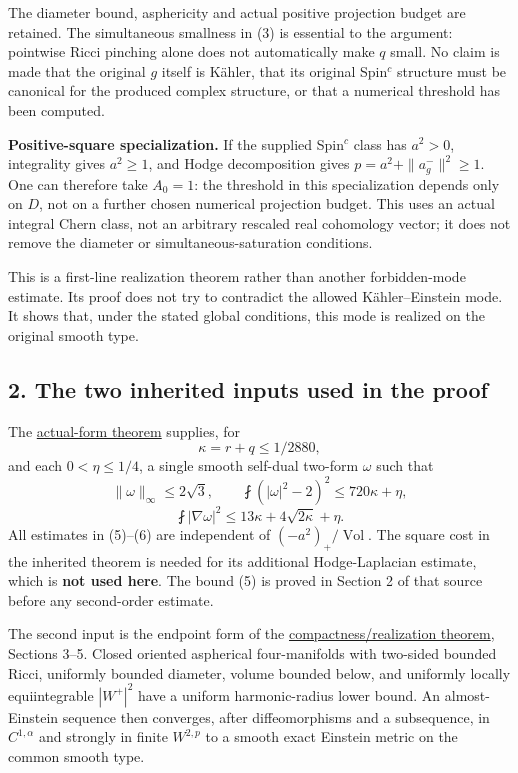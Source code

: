 \documentclass[
  11pt,
]{article}
\begin{document}
The diameter bound, asphericity and actual positive projection budget
are retained. The simultaneous smallness in (3) is essential to the
argument: pointwise Ricci pinching alone does not automatically make
\(q\) small. No claim is made that the original \(g\) itself is Kähler,
that its original Spin\(^c\) structure must be canonical for the
produced complex structure, or that a numerical threshold has been
computed.

\textbf{Positive-square specialization.} If the supplied Spin\(^c\)
class has \(a^2>0\), integrality gives \(a^2\ge1\), and Hodge
decomposition gives \(p=a^2+\|a_g^-\|^2\ge1\). One can therefore take
\(A_0=1\): the threshold in this specialization depends only on \(D\),
not on a further chosen numerical projection budget. This uses an actual
integral Chern class, not an arbitrary rescaled real cohomology vector;
it does not remove the diameter or simultaneous-saturation conditions.

This is a first-line realization theorem rather than another
forbidden-mode estimate. Its proof does not try to contradict the
allowed Kähler--Einstein mode. It shows that, under the stated global
conditions, this mode is realized on the original smooth type.

\hypertarget{the-two-inherited-inputs-used-in-the-proof}{%
\subsection{2. The two inherited inputs used in the
proof}\label{the-two-inherited-inputs-used-in-the-proof}}

The
\href{../mathematics/current/line1_composed_application.md}{actual-form
theorem} supplies, for \[
                  \kappa=r+q\le1/2880,
\] and each \(0<\eta\le1/4\), a single smooth self-dual two-form
\(\omega\) such that \[
 \|\omega\|_\infty\le2\sqrt3,
 \qquad \fint(|\omega|^2-2)^2\le720\kappa+\eta,
 \tag{5}
\] \[
 \fint|\nabla\omega|^2
        \le13\kappa+4\sqrt{2\kappa}+\eta.
 \tag{6}
\] All estimates in (5)--(6) are independent of
\((-a^2)_+/\operatorname{Vol}\). The square cost in the inherited
theorem is needed for its additional Hodge-Laplacian estimate, which is
\textbf{not used here}. The bound (5) is proved in Section 2 of that
source before any second-order estimate.

The second input is the endpoint form of the
\href{20260923_compact_realization.md}{compactness/realization theorem},
Sections 3--5. Closed oriented aspherical four-manifolds with two-sided
bounded Ricci, uniformly bounded diameter, volume bounded below, and
uniformly locally equiintegrable \(|W^+|^2\) have a uniform
harmonic-radius lower bound. An almost-Einstein sequence then converges,
after diffeomorphisms and a subsequence, in \(C^{1,\alpha}\) and
strongly in finite \(W^{2,p}\) to a smooth exact Einstein metric on the
common smooth type.
\end{document}
